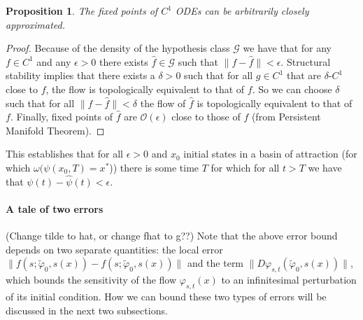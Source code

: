 \documentclass{article}
\newcommand{\ascomment}[1]{\textcolor{ascolor}{(#1)}}
\newtheorem{proposition}{Proposition}
\theoremstyle{definition} \newtheorem{definition}{Definition}
\theoremstyle{remark} \newtheorem{remark}{Remark}
\newcounter{ct}
\begin{document}
\begin{proposition}\label{prop:fp_approx}
The fixed points of $C^1$ ODEs can be arbitrarily closely approximated. %
\end{proposition}

\begin{proof}
Because of the density of the hypothesis class $\mathcal{G}$ we have that for any $f\in C^1$ and any $\epsilon>0$
there exists $\hat f\in\mathcal{G}$ such that $\|f-\hat f\|<\epsilon$.
%
Structural stability implies that there exists a $\delta>0$ such that for all $g\in C^1$ that are $\delta$-$C^1$ close to $f$, the flow is topologically equivalent to that of $f$.
%
So we can choose $\delta$ such that for all $\|f-\hat f\|<\delta$ the flow of $\hat f$ is topologically equivalent to that of $f$.
Finally, fixed points of $\hat f$ are $\mathcal{O}(\epsilon)$ close to those of $f$ (from Persistent Manifold Theorem\cite{jones1995gspt}).
\end{proof}

This establishes that for all $\epsilon>0$ and $x_0$ initial states in a basin of attraction (for which $\omega (\psi(x_0,T) = x^*$)) there is some time $T$ for which for all $t>T$ we have that $\psi(t)-\hat \psi(t)<\epsilon$.


\paragraph{A tale of two errors}
\ascomment{Change tilde to hat, or change fhat to g??}
Note that the above error bound depends on two separate quantities: the local error 
$\| f(s; \tilde{\varphi}_0, s(x)) - f(s; \tilde{\varphi}_0, s(x)) \|$ 
 and the term 
$\| D\varphi_{s,t}(\tilde{\varphi}_0, s(x)) \|$, 
which bounds the sensitivity of the flow $\varphi_{s,t}(x)$ to an infinitesimal perturbation of its initial condition.
How we can bound these two types of errors will be discussed in the next two subsections.%
\end{document}

